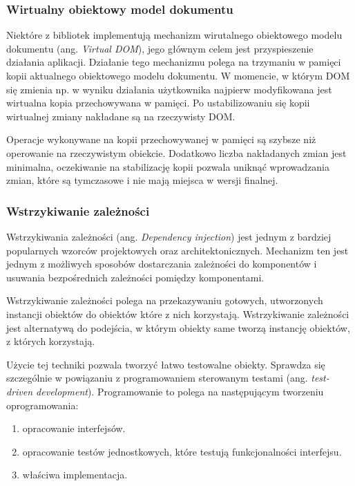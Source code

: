 \documentclass[polish, twoside, 12pt]{mwart}
\begin{document}
\subsubsection{Wirtualny obiektowy model dokumentu}

Niektóre z bibliotek implementują mechanizm wirutalnego obiektowego modelu dokumentu (ang. \emph{ Virtual DOM}), jego głównym celem jest przyspieszenie działania aplikacji. Działanie tego mechanizmu polega na trzymaniu w pamięci kopii aktualnego obiektowego modelu dokumentu. W momencie, w którym DOM się zmienia np. w wyniku działania użytkownika najpierw modyfikowana jest wirtualna kopia przechowywana w pamięci. Po ustabilizowaniu się kopii wirtualnej zmiany nakładane są na rzeczywisty DOM.

Operacje wykonywane na kopii przechowywanej w pamięci są szybsze niż operowanie na rzeczywistym obiekcie. Dodatkowo liczba nakładanych zmian jest minimalna, oczekiwanie na stabilizację kopii pozwala uniknąć wprowadzania zmian, które są tymczasowe i nie mają miejsca w wersji finalnej.

\subsubsection{Wstrzykiwanie zależności}

Wstrzykiwania zależności (ang. \emph {Dependency injection}) jest jednym z bardziej popularnych wzorców projektowych oraz architektonicznych. Mechanizm ten jest jednym z możliwych sposobów dostarczania zależności do komponentów i usuwania bezpośrednich zależności pomiędzy komponentami.

Wstrzykiwanie zależności polega na przekazywaniu gotowych, utworzonych instancji obiektów do obiektów które z nich korzystają. Wstrzykiwanie zależności jest alternatywą do podejścia, w którym obiekty same tworzą instancję obiektów, z których korzystają. 

Użycie tej techniki pozwala tworzyć łatwo testowalne obiekty. Sprawdza się szczególnie w powiązaniu z programowaniem sterowanym testami (ang. \emph{test-driven development}). Programowanie to polega na następującym tworzeniu oprogramowania:

\begin{enumerate} 
  \item opracowanie interfejsów.
  \item opracowanie testów jednostkowych, które testują funkcjonalności interfejsu.
  \item właściwa implementacja.
\end{enumerate}
\end{document}
